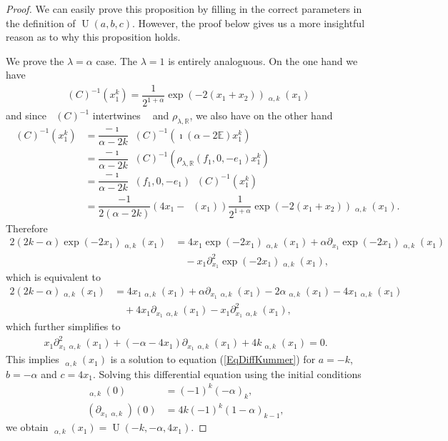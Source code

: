 \documentclass{amsart}
\numberwithin{theorem}{section}
\theoremstyle{definition}
\theoremstyle{remark}
\def\R{\mathds{R} }
\def\E{\mathds{E} }
\DeclareMathOperator{\bessel}{\mathcal B_\lambda}
\DeclareMathOperator{\KU}{U}
\DeclareMathOperator{\KO}{\widetilde U}
\newcommand{\iSB}{\pil(C)^{-1}}
\newcommand{\pt}[1]{\partial_{#1}}
\DeclareMathOperator{\pil}{\pi_\lambda}
\begin{document}
\begin{proof}
We can easily prove this proposition by filling in the correct parameters in the definition of $\KU(a,b,c)$. However, the proof below gives us a more insightful reason as to why this proposition holds.

We prove the $\lambda=\alpha$ case. The $\lambda=1$ is entirely analoguous. On the one hand we have 
\begin{align}\label{EqKO}
\iSB(x_1^k) = \dfrac{1}{2^{1+\alpha}}\exp(-2(x_1+x_2))\KO_{\alpha,k}(x_1) 
\end{align}
and since $\iSB$ intertwines $\pil$ and $\rho_{\lambda,\R}$, we also have  on the other hand 
\begin{align*}
\iSB(x_1^k) &= \dfrac{-\imath}{\alpha-2k}\iSB(\imath(\alpha-2\E)x_1^{k})\\
&= \dfrac{-\imath}{\alpha-2k}\iSB(\rho_{\lambda,\R}(f_1,0, -e_1)x_1^{k}) \\
&= \dfrac{-\imath}{\alpha-2k}\pil(f_1,0, -e_1)\iSB(x_1^{k})\\
&= \dfrac{-1}{2(\alpha-2k)}\left(4x_1-\bessel(x_1)\right)\dfrac{1}{2^{1+\alpha}}\exp(-2(x_1+x_2))\KO_{\alpha,k}(x_1).
\end{align*}
Therefore
\begin{align*}
2(2k-\alpha)\exp(-2x_1)\KO_{\alpha,k}(x_1) &= 4x_1 \exp(-2x_1)\KO_{\alpha,k}(x_1) +\alpha \pt {x_1} \exp(-2x_1)\KO_{\alpha,k}(x_1)\\
&\quad - x_1 \pt {x_1}^2\exp(-2x_1)\KO_{\alpha,k}(x_1),
\end{align*}
which is equivalent to
\begin{align*}
2(2k-\alpha)\KO_{\alpha,k}(x_1) &= 4x_1 \KO_{\alpha,k}(x_1) +\alpha  \pt {x_1}\KO_{\alpha,k}(x_1) -2\alpha \KO_{\alpha,k}(x_1) - 4 x_1 \KO_{\alpha,k}(x_1)\\
&\quad + 4 x_1 \pt {x_1}\KO_{\alpha,k}(x_1)- x_1 \pt {x_1}^2\KO_{\alpha,k}(x_1),
\end{align*}
which further simplifies to
\begin{align}\label{EqDiff}
x_1\pt {x_1}^2 \KO_{\alpha,k}(x_1) + (-\alpha - 4x_1)\pt {x_1}\KO_{\alpha,k}(x_1)+4k \KO_{\alpha,k}(x_1) =0.
\end{align}
This implies $\KO_{\alpha,k}(x_1)$ is a solution to equation (\ref{EqDiffKummer}) for $a = -k$, $b = -\alpha$ and $c=4x_1$. Solving this differential equation using the initial conditions 
\begin{align*}
\KO_{\alpha, k}(0) &=(-1)^k(-\alpha)_k,\\
(\pt {x_1} \KO_{\alpha, k})(0) &= 4k(-1)^k(1-\alpha)_{k-1},
\end{align*}
we obtain $\KO_{\alpha,k}(x_1) = \KU(-k,-\alpha,4x_1)$.
\end{proof}
\end{document}
